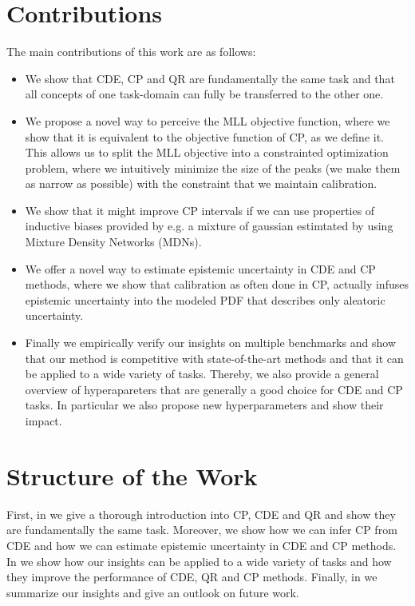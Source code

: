 \section{Contributions}\label{sec:contributions}

The main contributions of this work are as follows:

\begin{itemize}
    \item We show that CDE, CP and QR are fundamentally the same task and that all concepts of one task-domain can fully be transferred to the other one.
    \item We propose a novel way to perceive the MLL objective function, where we show that it is equivalent to the objective function of CP, as we define it. This allows us to split the MLL objective into a constrainted optimization problem, where we intuitively minimize the size of the peaks (we make them as narrow as possible) with the constraint that we maintain calibration.
    \item We show that it might improve CP intervals if we can use properties of inductive biases provided by e.g. a mixture of gaussian estimtated by using Mixture Density Networks (MDNs).
    \item We offer a novel way to estimate epistemic uncertainty in CDE and CP methods, where we show that calibration as often done in CP, actually infuses epistemic uncertainty into the modeled PDF that describes only aleatoric uncertainty.
    \item Finally we empirically verify our insights on multiple benchmarks and show that our method is competitive with state-of-the-art methods and that it can be applied to a wide variety of tasks. Thereby, we also provide a general overview of hyperapareters that are generally a good choice for CDE and CP tasks. In particular we also propose new hyperparameters and show their impact.
\end{itemize}

\section{Structure of the Work}\label{sec:structure}

First, in  we give a thorough introduction into CP, CDE and QR and show they are fundamentally the same task. Moreover, we show how we can infer CP from CDE and how we can estimate epistemic uncertainty in CDE and CP methods. In  we show how our insights can be applied to a wide variety of tasks and how they improve the performance of CDE, QR and CP methods. Finally, in  we summarize our insights and give an outlook on future work.


